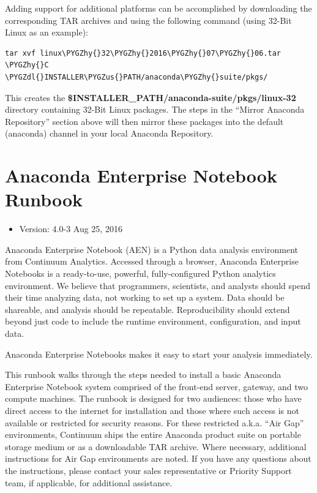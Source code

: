 \documentclass[letterpaper,10pt,openany,oneside]{sphinxmanual}
\def\PYGZus{\char`\_}
\def\PYGZdl{\char`\$}
\def\PYGZhy{\char`\-}
\begin{document}
Adding support for additional platforms can be accomplished by downloading the corresponding TAR archives and using the following command (using 32-Bit Linux as an example):

\begin{Verbatim}[commandchars=\\\{\}]
tar xvf linux\PYGZhy{}32\PYGZhy{}2016\PYGZhy{}07\PYGZhy{}06.tar \PYGZhy{}C \PYGZdl{}INSTALLER\PYGZus{}PATH/anaconda\PYGZhy{}suite/pkgs/
\end{Verbatim}

This creates the \textbf{\$INSTALLER\_PATH/anaconda-suite/pkgs/linux-32} directory
containing 32-Bit Linux packages.  The steps in the ``Mirror Anaconda
Repository'' section above will then mirror these packages into the default
(anaconda) channel in your local Anaconda Repository.


\chapter{Anaconda Enterprise Notebook Runbook}
\label{AnacondaEnterpriseNotebooks:anaconda-enterprise-notebook-runbook}\label{AnacondaEnterpriseNotebooks::doc}\begin{itemize}
\item {} 
Version: 4.0-3 \textbar{} Aug 25, 2016

\end{itemize}

Anaconda Enterprise Notebook (AEN) is a Python data analysis environment from
Continuum Analytics. Accessed through a browser, Anaconda Enterprise
Notebooks is a ready-to-use, powerful, fully-configured Python analytics
environment. We believe that programmers, scientists, and analysts
should spend their time analyzing data, not working to set up a system.
Data should be shareable, and analysis should be repeatable.
Reproducibility should extend beyond just code to include the runtime
environment, configuration, and input data.

Anaconda Enterprise Notebooks makes it easy to start your analysis
immediately.

This runbook walks through the steps needed to install a basic Anaconda
Enterprise Notebook system comprised of the front-end server, gateway,
and two compute machines. The runbook is designed for two audiences:
those who have direct access to the internet for installation and those
where such access is not available or restricted for security reasons.
For these restricted a.k.a. ``Air Gap'' environments, Continuum ships the
entire Anaconda product suite on portable storage medium or as a
downloadable TAR archive. Where necessary, additional instructions for
Air Gap environments are noted. If you have any questions about the
instructions, please contact your sales representative or Priority
Support team, if applicable, for additional assistance.
\end{document}
